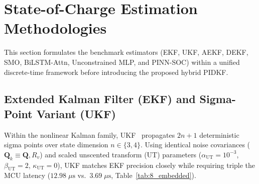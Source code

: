 \documentclass[10pt,a4paper]{article}
\providecommand{\upmu}{\mu}
\begin{document}
\section{State-of-Charge Estimation Methodologies}
This section formulates the benchmark estimators (EKF, UKF, AEKF, DEKF, SMO, BiLSTM-Attn, Unconstrained MLP, and PINN-SOC) within a unified discrete-time framework before introducing the proposed hybrid PIDKF.

\subsection{Extended Kalman Filter (EKF) and Sigma-Point Variant (UKF)}
Within the nonlinear Kalman family, UKF~\cite{Plett2006ukf,He2013ukf} propagates $2n+1$ deterministic sigma points over state dimension $n \in \{3,4\}$. Using identical noise covariances ($\mathbf{Q}_k \equiv \mathbf{Q}, R_v$) and scaled unscented transform (UT) parameters ($\alpha_{\text{UT}} = 10^{-3}$, $\beta_{\text{UT}} = 2$, $\kappa_{\text{UT}} = 0$), UKF matches EKF precision closely while requiring triple the MCU latency ($12.98\;\upmu\mathrm{s}$ vs.\ $3.69\;\upmu\mathrm{s}$, Table~\ref{tab:8_embedded}).
\end{document}
